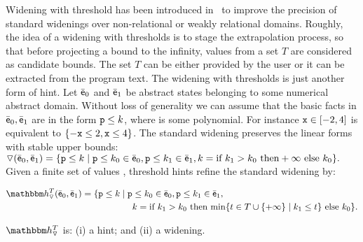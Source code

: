 \documentclass{llncs}
\newcommand{\sopra}{\vspace{-.3cm}}
\begin{document}
Widening with threshold has been introduced in~\cite{BlanchetCousotEtAl03} to improve the precision of standard widenings over non-relational or weakly relational domains.
Roughly, the idea of a widening with thresholds is to stage the extrapolation process, so that before projecting a bound to the infinity, values from a set $T$ are considered as candidate bounds.
The set $T$ can be either provided by the user or it can be extracted from the program text.
The widening with thresholds is just another form of hint.
Let $\bar{\mathsf{\mathsf{e}}}_0$ and $\bar{\mathsf{\mathsf{e}}}_1$ be abstract states belonging to some numerical abstract domain.
Without loss of generality we can assume that the basic facts in $\bar{\mathsf{\mathsf{e}}}_0, \bar{\mathsf{\mathsf{e}}}_1$ are in the form $\mathtt{p} \leq k$, where  is some polynomial.
For instance $\mathtt{x} \in [-2, 4]$ is equivalent to $\{ -\mathtt{x} \leq 2, \mathtt{x} \leq 4 \}$.
The standard widening preserves the linear forms with stable upper bounds:
\(
\triangledown (\bar{\mathsf{\mathsf{e}}}_0,\bar{\mathsf{\mathsf{e}}}_1) = \{ \mathtt{p} \leq k \mid \mathtt{p} \leq k_0\in \bar{\mathsf{\mathsf{e}}}_0, \mathtt{p} \leq k_1\in \bar{\mathsf{\mathsf{e}}}_1, k = \text{if } k_1 > k_0 \text{ then} +\infty \text{ else }  k_0\}.
\)
Given a finite set of values , threshold hints refine the standard widening by:

\sopra
\begin{small}
  \begin{align*}
    \hint{\widening}^T(\ael{e}_0,\ael{e}_1) =  \{ \code{p} \leq k \mid \code{p} & \leq k_0\in \ael{e}_0, \code{p} \leq k_1\in \ael{e}_1, \\
    & k = \text{if } k_1 > k_0 \text{ then } \mathrm{min}\{ t \in T \cup \{ +\infty \} \mid k_1 \leq t \} \text{ else }  k_0\}.
  \end{align*}
\end{small}
\begin{lemma}
$\hint{\widening}^T$ is: (i) a hint; and (ii) a widening.
\end{lemma}
\end{document}
